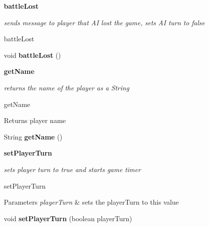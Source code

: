 \begin{Indent}{\bf battle\+Lost}\par
{\em sends message to player that A\+I lost the game, sets A\+I turn to false

battle\+Lost }\begin{DoxyCompactItemize}
\item 
\hypertarget{classbattleship_1_1network_1_1AIPlayer_ac40408f4175e7d5d2797a2ab143995ce}{}void {\bfseries battle\+Lost} ()\label{classbattleship_1_1network_1_1AIPlayer_ac40408f4175e7d5d2797a2ab143995ce}

\end{DoxyCompactItemize}
\end{Indent}
\begin{Indent}{\bf get\+Name}\par
{\em returns the name of the player as a String

get\+Name

\begin{DoxyReturn}{Returns}
player name 
\end{DoxyReturn}
}\begin{DoxyCompactItemize}
\item 
\hypertarget{classbattleship_1_1network_1_1AIPlayer_a67ca4a45ccd307e73528896f8ae0b5c1}{}String {\bfseries get\+Name} ()\label{classbattleship_1_1network_1_1AIPlayer_a67ca4a45ccd307e73528896f8ae0b5c1}

\end{DoxyCompactItemize}
\end{Indent}
\begin{Indent}{\bf set\+Player\+Turn}\par
{\em sets player turn to true and starts game timer

set\+Player\+Turn


\begin{DoxyParams}{Parameters}
{\em player\+Turn} & sets the player\+Turn to this value \\
\hline
\end{DoxyParams}
}\begin{DoxyCompactItemize}
\item 
\hypertarget{classbattleship_1_1network_1_1AIPlayer_a30bc4f29a484c7206e17868e2e4080e5}{}void {\bfseries set\+Player\+Turn} (boolean player\+Turn)\label{classbattleship_1_1network_1_1AIPlayer_a30bc4f29a484c7206e17868e2e4080e5}

\end{DoxyCompactItemize}
\end{Indent}
